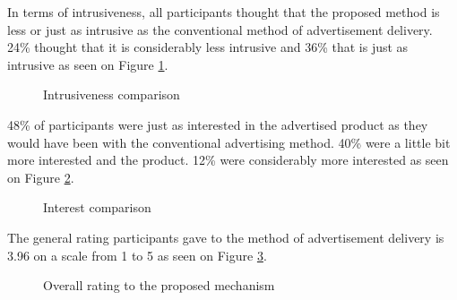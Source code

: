In terms of intrusiveness, all participants thought that the proposed method is less or just as intrusive as the conventional method of advertisement delivery. 24\% thought that it is considerably less intrusive and 36\% that is just as intrusive as seen on Figure \ref{q8}.

\begin{figure}
\begin{center}
\caption{Intrusiveness comparison}
\label{q8}
\end{center}
\end{figure}

48\% of participants were just as interested in the advertised product as they would have been with the conventional advertising method. 40\% were a little bit more interested and the product. 12\% were considerably more interested as seen on Figure \ref{q9}.

\begin{figure}
\begin{center}
\caption{Interest comparison}
\label{q9}
\end{center}
\end{figure}

The general rating participants gave to the method of advertisement delivery is 3.96 on a scale from 1 to 5 as seen on Figure \ref{q10}.

\begin{figure}
\begin{center}
\caption{Overall rating to the proposed mechanism}
\label{q10}
\end{center}
\end{figure}

